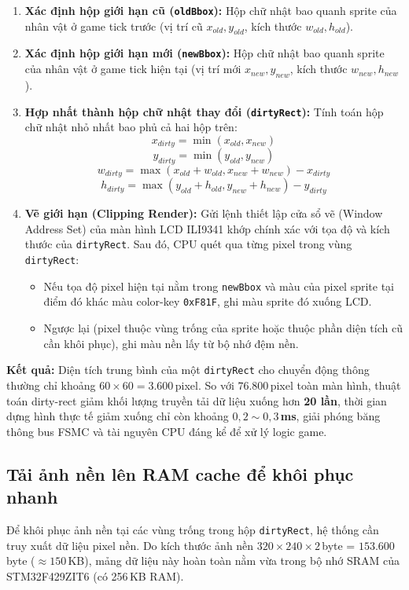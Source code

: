 \documentclass[a4paper,12pt]{report}
\begin{document}
\begin{enumerate}
    \item \textbf{Xác định hộp giới hạn cũ (\texttt{oldBbox}):} Hộp chữ nhật bao quanh sprite của nhân vật ở game tick trước (vị trí cũ $x_{old}, y_{old}$, kích thước $w_{old}, h_{old}$).
    \item \textbf{Xác định hộp giới hạn mới (\texttt{newBbox}):} Hộp chữ nhật bao quanh sprite của nhân vật ở game tick hiện tại (vị trí mới $x_{new}, y_{new}$, kích thước $w_{new}, h_{new}$).
    \item \textbf{Hợp nhất thành hộp chữ nhật thay đổi (\texttt{dirtyRect}):} Tính toán hộp chữ nhật nhỏ nhất bao phủ cả hai hộp trên:
    \[
    x_{dirty} = \min(x_{old}, x_{new})
    \]
    \[
    y_{dirty} = \min(y_{old}, y_{new})
    \]
    \[
    w_{dirty} = \max(x_{old} + w_{old}, x_{new} + w_{new}) - x_{dirty}
    \]
    \[
    h_{dirty} = \max(y_{old} + h_{old}, y_{new} + h_{new}) - y_{dirty}
    \]
    \item \textbf{Vẽ giới hạn (Clipping Render):} Gửi lệnh thiết lập cửa sổ vẽ (Window Address Set) của màn hình LCD ILI9341 khớp chính xác với tọa độ và kích thước của \texttt{dirtyRect}. Sau đó, CPU quét qua từng pixel trong vùng \texttt{dirtyRect}:
    \begin{itemize}
        \item Nếu tọa độ pixel hiện tại nằm trong \texttt{newBbox} và màu của pixel sprite tại điểm đó khác màu color-key \texttt{0xF81F}, ghi màu sprite đó xuống LCD.
        \item Ngược lại (pixel thuộc vùng trống của sprite hoặc thuộc phần diện tích cũ cần khôi phục), ghi màu nền lấy từ bộ nhớ đệm nền.
    \end{itemize}
\end{enumerate}

\noindent \textbf{Kết quả:} Diện tích trung bình của một \texttt{dirtyRect} cho chuyển động thông thường chỉ khoảng $60 \times 60 = 3.600$\,pixel. So với $76.800$\,pixel toàn màn hình, thuật toán dirty-rect giảm khối lượng truyền tải dữ liệu xuống hơn \textbf{20 lần}, thời gian dựng hình thực tế giảm xuống chỉ còn khoảng \textbf{$0{,}2 \sim 0{,}3$\,ms}, giải phóng băng thông bus FSMC và tài nguyên CPU đáng kể để xử lý logic game.

\subsection{Tải ảnh nền lên RAM cache để khôi phục nhanh}

Để khôi phục ảnh nền tại các vùng trống trong hộp \texttt{dirtyRect}, hệ thống cần truy xuất dữ liệu pixel nền. Do kích thước ảnh nền $320 \times 240 \times 2$\,byte = $153.600$\,byte ($\approx 150$\,KB), mảng dữ liệu này hoàn toàn nằm vừa trong bộ nhớ SRAM của STM32F429ZIT6 (có 256\,KB RAM).
\end{document}
